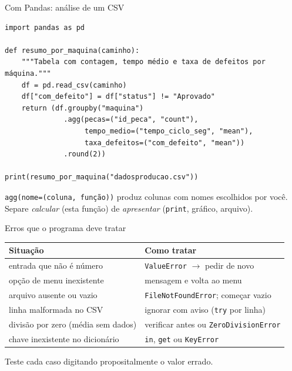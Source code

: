 \documentclass[aspectratio=169,10pt,t]{beamer}
\begin{document}
\begin{frame}[fragile]{Com Pandas: análise de um CSV}
\begin{lstlisting}
import pandas as pd

def resumo_por_maquina(caminho):
    """Tabela com contagem, tempo médio e taxa de defeitos por máquina."""
    df = pd.read_csv(caminho)
    df["com_defeito"] = df["status"] != "Aprovado"
    return (df.groupby("maquina")
              .agg(pecas=("id_peca", "count"),
                   tempo_medio=("tempo_ciclo_seg", "mean"),
                   taxa_defeitos=("com_defeito", "mean"))
              .round(2))

print(resumo_por_maquina("dadosproducao.csv"))
\end{lstlisting}
  \small \texttt{agg(nome=(coluna, função))} produz colunas com nomes escolhidos por você. Separe \emph{calcular} (esta função) de \emph{apresentar} (\texttt{print}, gráfico, arquivo).
\end{frame}

\begin{frame}{Erros que o programa deve tratar}
  \centering\small
  \begin{tabular}{p{5cm}p{6cm}}
    \toprule
    \textbf{Situação} & \textbf{Como tratar}\\
    \midrule
    entrada que não é número & \texttt{ValueError} \(\to\) pedir de novo\\
    opção de menu inexistente & mensagem e volta ao menu\\
    arquivo ausente ou vazio & \texttt{FileNotFoundError}; começar vazio\\
    linha malformada no CSV & ignorar com aviso (\texttt{try} por linha)\\
    divisão por zero (média sem dados) & verificar antes ou \texttt{ZeroDivisionError}\\
    chave inexistente no dicionário & \texttt{in}, \texttt{get} ou \texttt{KeyError}\\
    \bottomrule
  \end{tabular}
  \vspace{1ex}

  \footnotesize Teste cada caso digitando propositalmente o valor errado.
\end{frame}
\end{document}
